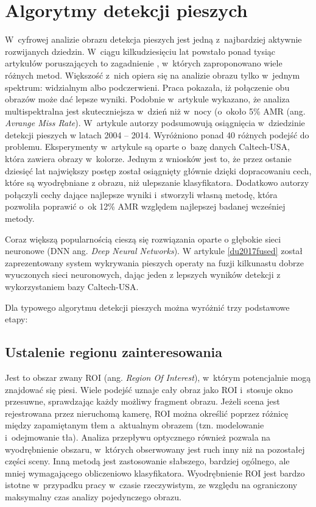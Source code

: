 \chapter{Algorytmy detekcji pieszych}
\label{cha:algoDetPiesz}

W~cyfrowej analizie obrazu detekcja pieszych jest jedną z~najbardziej aktywnie rozwijanych dziedzin.
W~ciągu kilkudziesięciu lat powstało ponad tysiąc artykułów poruszających to zagadnienie \cite{zhang2015filtered}, w~których zaproponowano wiele różnych metod.
Większość z~nich opiera się na analizie obrazu tylko w~jednym spektrum: widzialnym albo podczerwieni.
Praca \cite{hwang2015multispectral} pokazała, iż połączenie obu obrazów może dać lepsze wyniki.
Podobnie w~artykule \cite{gonzalez2016pedestrian} wykazano, że analiza multispektralna jest skuteczniejsza w~dzień niż w~nocy (o~około 5\% AMR (ang. \textit{Avrange Miss Rate}).
W~artykule \cite{benenson2014ten} autorzy podsumowują osiągnięcia w~dziedzinie detekcji pieszych w latach 2004 -- 2014.
Wyróżniono ponad 40 różnych podejść do problemu.
Eksperymenty w~artykule są oparte o~bazę danych Caltech-USA, która zawiera obrazy w~kolorze.
Jednym z wniosków jest to, że przez ostanie dziesięć lat największy postęp został osiągnięty głównie dzięki dopracowaniu cech, które są wyodrębniane z obrazu, niż ulepszanie klasyfikatora.
Dodatkowo autorzy połączyli cechy dające najlepsze wyniki i~stworzyli własną metodę, która pozwoliła poprawić o~ok 12\% AMR względem najlepszej badanej wcześniej metody.

Coraz większą popularnością cieszą się rozwiązania oparte o głębokie sieci neuronowe  (DNN ang. \textit{Deep Neural Networks}). W artykule \ref{du2017fused} został zaprezentowany system wykrywania pieszych operaty na fuzji kilkunastu dobrze wyuczonych sieci neuronowych, dając jeden z lepszych wyników detekcji z wykorzystaniem bazy Caltech-USA. 

Dla typowego algorytmu detekcji pieszych można wyróżnić trzy podstawowe etapy:

\section{Ustalenie regionu zainteresowania}

Jest to obszar zwany ROI (ang. \textit{Region Of Interest}), w~którym potencjalnie mogą znajdować się piesi.
Wiele podejść uznaje cały obraz jako ROI i~stosuje okno przesuwne, sprawdzając każdy możliwy fragment obrazu.
Jeżeli scena jest rejestrowana przez nieruchomą kamerę, ROI można określić poprzez różnicę między zapamiętanym tłem a~aktualnym obrazem (tzn. modelowanie i~odejmowanie tła). 
Analiza przepływu optycznego również pozwala na wyodrębnienie obszaru, w~których obserwowany jest ruch inny niż na pozostałej części sceny. 
Inną metodą jest zastosowanie słabszego, bardziej ogólnego, ale mniej wymagającego obliczeniowo  klasyfikatora.
Wyodrębnienie ROI jest bardzo istotne w~przypadku pracy w~czasie rzeczywistym, ze względu na ograniczony maksymalny czas analizy pojedynczego obrazu.

